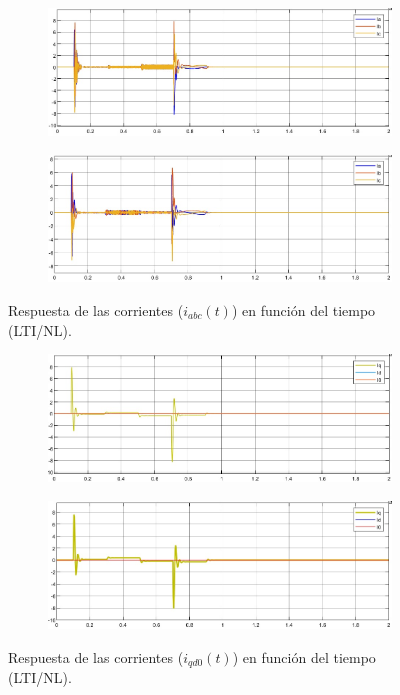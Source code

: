 \documentclass{article}
\begin{document}
\begin{figure}[H]
    \centering
    \begin{subfigure}[b]{0.8\textwidth}
        \includegraphics[width=\textwidth]{5.1.6_iabc.jpg}
    \end{subfigure}
    \begin{subfigure}[b]{0.8\textwidth}
        \includegraphics[width=1\textwidth]{5.1.6_iabc_NL.jpg}
    \end{subfigure}
    \caption{Respuesta de las corrientes ($i_{abc}(t)$) en función del tiempo (LTI/NL).}
    \label{fig:iabc}
\end{figure}

\begin{figure}[H]
    \centering
    \begin{subfigure}[b]{0.8\textwidth}
        \includegraphics[width=\textwidth]{5.1.6_iqd0.jpg}
    \end{subfigure}
    \begin{subfigure}[b]{0.8\textwidth}
        \includegraphics[width=1\textwidth]{5.1.6_iqd0_NL.jpg}
    \end{subfigure}
    \caption{Respuesta de las corrientes ($i_{qd0}(t)$) en función del tiempo (LTI/NL).}
    \label{fig:iqd0}
\end{figure}
\end{document}
